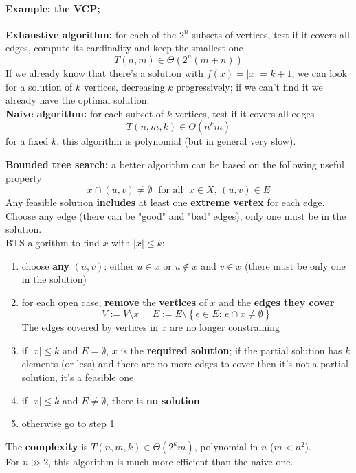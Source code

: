 \paragraph{Example: the VCP;} \textbf{Exhaustive algorithm:} for each of the $2^n$ subsets of vertices, test if it covers all edges, compute its cardinality and keep the smallest one
$$ T(n,m) \in \Theta \left(2^n (m+n)\right) $$
If we already know that there's a solution with $f(x) = |x| = k+1$, we can look for a solution of $k$ vertices, decreasing $k$ progressively; if we can't find it we already have the optimal solution.\\

\textbf{Naive algorithm:} for each subset of $k$ vertices, test if it covers all edges
$$ T(n,m,k) \in \Theta \left(n^k m\right) $$
for a fixed $k$, this algorithm is polynomial (but in general very slow).\\

\newpage

\textbf{Bounded tree search:} a better algorithm can be based on the following useful property
$$ x \cap (u,v) \neq \emptyset \; \text{ for all } \; x \in X, \, (u,v) \in E $$
Any feasible solution \textbf{includes} at least one \textbf{extreme vertex} for each edge.\\
Choose any edge (there can be "good" and "bad" edges), only one must be in the solution.\\

BTS algorithm to find $x$ with $|x| \leq k$:
\begin{enumerate}
	\item choose \textbf{any} $(u,v)$: either $u \in x$ or $u \notin x$ and $v \in x$ (there must be only one in the solution)
	\item for each open case, \textbf{remove} the \textbf{vertices} of $x$ and the \textbf{edges they cover}
	$$ V := V \setminus x \;\;\;\;\; E := E \setminus \left\{e \in E: \, e \cap x \neq \emptyset \right\}$$
	The edges covered by vertices in $x$ are no longer constraining
	\item if $|x| \leq k$ and $E = \emptyset$, $x$ is the \textbf{required solution}; if the partial solution has $k$ elements (or less) and there are no more edges to cover then it's not a partial solution, it's a feasible one
	\item if $|x| \leq k$ and $E \neq \emptyset$, there is \textbf{no solution}
	\item otherwise go to step 1
\end{enumerate}
The \textbf{complexity} is $T(n,m,k) \in \Theta(2^k m)$, polynomial in $n$ ($m < n^2$). \\
For $n \gg 2$, this algorithm is much more efficient than the naive one.\\

